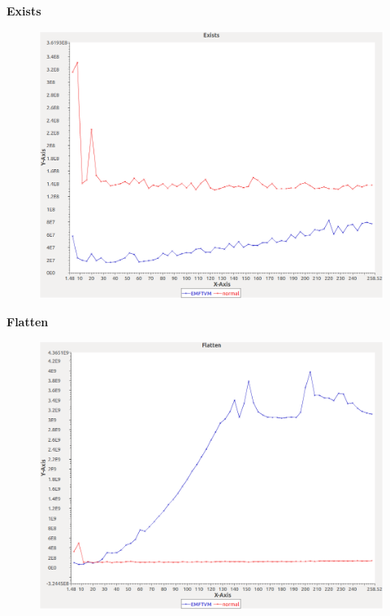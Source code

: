 \noindent\textbf{Exists}

\begin{figure}[h]
\centering
\includegraphics[width=\textwidth]{../graphs/set/Exists}
\end{figure}
\pagebreak

\noindent\textbf{Flatten}

\begin{figure}[h]
\centering
\includegraphics[width=\textwidth]{../graphs/set/Flatten}
\end{figure}
\pagebreak


